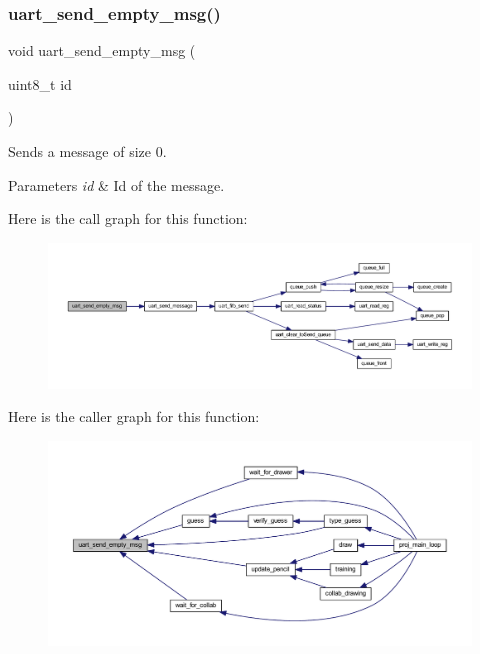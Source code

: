 \subsubsection{\texorpdfstring{uart\+\_\+send\+\_\+empty\+\_\+msg()}{uart\_send\_empty\_msg()}}
{\footnotesize\ttfamily void uart\+\_\+send\+\_\+empty\+\_\+msg (\begin{DoxyParamCaption}\item[{uint8\+\_\+t}]{id }\end{DoxyParamCaption})}



Sends a message of size 0. 


\begin{DoxyParams}{Parameters}
{\em id} & Id of the message. \\
\hline
\end{DoxyParams}
Here is the call graph for this function\+:\nopagebreak
\begin{figure}[H]
\begin{center}
\leavevmode
\includegraphics[width=350pt]{group__uart__protocol_ga135e4c7043b1c4cd01caa52830b459de_cgraph}
\end{center}
\end{figure}
Here is the caller graph for this function\+:\nopagebreak
\begin{figure}[H]
\begin{center}
\leavevmode
\includegraphics[width=350pt]{group__uart__protocol_ga135e4c7043b1c4cd01caa52830b459de_icgraph}
\end{center}
\end{figure}
\mbox{\label{group__uart__protocol_ga5f455eb88a92b234368bc2d77c295f6a}} 
